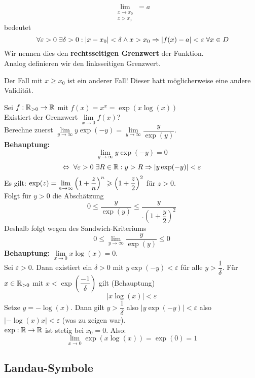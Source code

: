 \documentclass[main.tex]{subfiles}
\begin{document}
\begin{Definition}
  $$\lim \limits_{\substack{x \to x_0 \\ x > x_0}} = a$$
  bedeutet
  $$\;\forall \varepsilon > 0 \;\exists \delta > 0 : |x - x_0| < \delta \land x > x_0 \Rightarrow |f(x)-a|<\varepsilon \;\forall x \in D$$
  Wir nennen dies den \textbf{rechtsseitigen Grenzwert} der Funktion.\\
  Analog definieren wir den linksseitigen Grenzwert.
\end{Definition}

\begin{Bemerkung}
  Der Fall mit $x \geq x_0$ ist ein anderer Fall! Dieser hatt möglicherweise eine andere Validität.
\end{Bemerkung}

\begin{Beispiel}
  Sei $f: \mathbb{R}_{> 0} \to \mathbb{R}$ mit $f(x) = x^x = \exp(x \log(x))$\\
  Existiert der Grenzwert $\lim \limits_{x \to 0} f(x)$?\\
  Berechne zuerst $\lim \limits_{y \to \infty} y \exp(-y) = \lim \limits_{y \to \infty} \dfrac{y}{\exp(y)}$.\\
  \textbf{Behauptung:}
  $$\lim \limits_{y \to \infty} y \exp(-y) = 0$$
  $$\Leftrightarrow \;\forall \varepsilon > 0 \;\exists R \in \mathbb{R} : y > R \Rightarrow |y \exp(-y)| < \varepsilon$$
  Es gilt: $\exp(z) = \lim \limits_{n \to \infty} \left( 1 +\dfrac{z}{n}\right)^n \geqslant \left( 1 +\dfrac{z}{2}\right)^2$ für $z > 0$.\\
  Folgt für $y > 0$ die Abschätzung
  $$0 \leq \dfrac{y}{\exp(y)} \leq \dfrac{y}{.\left(1+\dfrac{y}{2}\right)^2}$$
  Deshalb folgt wegen des Sandwich-Kriteriums
  $$0 \leq \lim \limits_{y \to \infty} \dfrac{y}{\exp(y)} \leq 0$$
  \textbf{Behauptung:} $\lim \limits_{x \to 0} x \log(x) = 0$.\\
  Sei $\varepsilon > 0$. Dann existiert ein $\delta > 0$ mit $y \exp(-y) < \varepsilon$ für alle $y > \dfrac{1}{\delta}$. Für $x \in \mathbb{R}_{> 0}$ mit $x < \exp\left(\dfrac{-1}{\delta}\right)$ gilt (Behauptung)
  $$|x \log(x)| < \varepsilon$$
  Setze $y = -\log(x)$. Dann gilt $y > \dfrac{1}{\delta}$ also $|y \exp(-y)| < \varepsilon$ also $|-\log(x)x| < \varepsilon$ (was zu zeigen war).\\
  $\exp : \mathbb{R} \to \mathbb{R}$ ist stetig bei $x_0 = 0$. Also:
  $$\lim \limits_{x \to 0} \exp(x \log(x)) = \exp(0) = 1$$
\end{Beispiel}

\subsection{Landau-Symbole}
\end{document}
